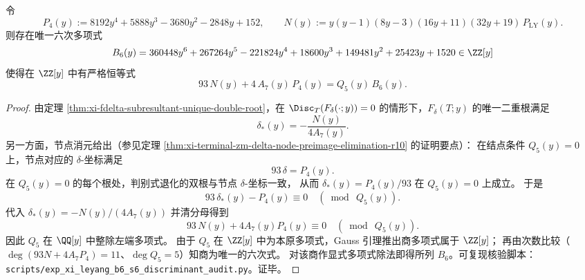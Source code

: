 \begin{theorem}\label{thm:xi-leyang-b6-from-node-vs-double-root}
令
\[
P_4(y):=8192y^4+5888y^3-3680y^2-2848y+152,
\qquad
N(y):=y(y-1)(8y-3)(16y+11)(32y+19)\,P_{\mathrm{LY}}(y).
\]
则存在唯一六次多项式
\[
B_6(y)=360448y^6+267264y^5-221824y^4+18600y^3+149481y^2+25423y+1520\in\ZZ[y]
\]
使得在 \(\ZZ[y]\) 中有严格恒等式
\[
93\,N(y)+4\,A_7(y)\,P_4(y)=Q_5(y)\,B_6(y).
\]
\end{theorem}
\begin{proof}
由定理 \ref{thm:xi-fdelta-subresultant-unique-double-root}，在 \(\Disc_T(F_\delta(\cdot;y))=0\) 的情形下，\(F_\delta(T;y)\) 的唯一二重根满足
\[
\delta_\ast(y)=-\frac{N(y)}{4A_7(y)}.
\]
另一方面，节点消元给出（参见定理 \ref{thm:xi-terminal-zm-delta-node-preimage-elimination-r10} 的证明要点）：
在结点条件 \(Q_5(y)=0\) 上，节点对应的 \(\delta\)-坐标满足
\[
93\,\delta=P_4(y).
\]
在 \(Q_5(y)=0\) 的每个根处，判别式退化的双根与节点 \(\delta\)-坐标一致，
从而 \(\delta_\ast(y)=P_4(y)/93\) 在 \(Q_5(y)=0\) 上成立。
于是
\[
93\,\delta_\ast(y)-P_4(y)\equiv 0\quad(\bmod\ Q_5(y)).
\]
代入 \(\delta_\ast(y)=-N(y)/(4A_7(y))\) 并清分母得到
\[
93\,N(y)+4A_7(y)P_4(y)\equiv 0\quad(\bmod\ Q_5(y)).
\]
因此 \(Q_5\) 在 \(\QQ[y]\) 中整除左端多项式。
由于 \(Q_5\) 在 \(\ZZ[y]\) 中为本原多项式，Gauss 引理推出商多项式属于 \(\ZZ[y]\)；
再由次数比较（\(\deg(93N+4A_7P_4)=11\)、\(\deg Q_5=5\)）知商为唯一的六次式。
对该商作显式多项式除法即得所列 \(B_6\)。可复现核验脚本：\texttt{scripts/exp\_xi\_leyang\_b6\_s6\_discriminant\_audit.py}。证毕。
\end{proof}

